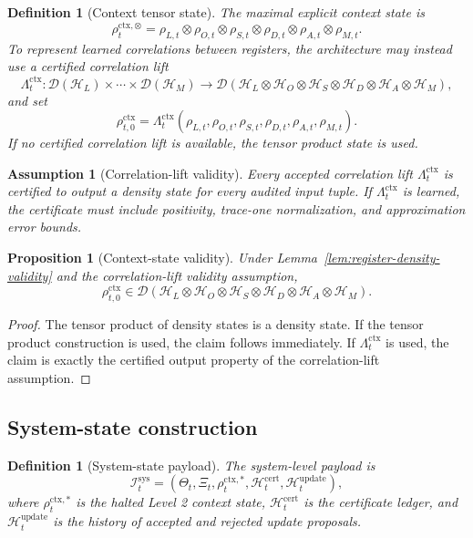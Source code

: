 \documentclass[11pt,a4paper]{article}
\newtheorem{proposition}[theorem]{Proposition}
\newtheorem{definition}[theorem]{Definition}
\newtheorem{assumption}[theorem]{Assumption}
\newcommand{\D}{\mathcal D}
\newcommand{\Hcal}{\mathcal H}
\newcommand{\sys}{\mathrm{sys}}
\newcommand{\ctx}{\mathrm{ctx}}
\newcommand{\cert}{\mathrm{cert}}
\newcommand{\update}{\mathrm{update}}
\begin{document}
\begin{definition}[Context tensor state]
The maximal explicit context state is
\[
\rho_t^{\ctx,\otimes}=\rho_{L,t}\otimes\rho_{O,t}\otimes\rho_{S,t}\otimes\rho_{D,t}\otimes\rho_{A,t}\otimes\rho_{M,t}.
\]
To represent learned correlations between registers, the architecture may instead use a certified correlation lift
\[
\Lambda_t^{\ctx}:\D(\Hcal_L)\times\cdots\times\D(\Hcal_M)\to
\D(\Hcal_L\otimes\Hcal_O\otimes\Hcal_S\otimes\Hcal_D\otimes\Hcal_A\otimes\Hcal_M),
\]
and set
\[
\rho_{t,0}^{\ctx}=\Lambda_t^{\ctx}(\rho_{L,t},\rho_{O,t},\rho_{S,t},\rho_{D,t},\rho_{A,t},\rho_{M,t}).
\]
If no certified correlation lift is available, the tensor product state is used.
\end{definition}

\begin{assumption}[Correlation-lift validity]
Every accepted correlation lift \(\Lambda_t^{\ctx}\) is certified to output a density state for every audited input tuple.  If \(\Lambda_t^{\ctx}\) is learned, the certificate must include positivity, trace-one normalization, and approximation error bounds.
\end{assumption}

\begin{proposition}[Context-state validity]
\label{prop:context-state-validity}
Under Lemma~\ref{lem:register-density-validity} and the correlation-lift validity assumption,
\[
\rho_{t,0}^{\ctx}\in\D(\Hcal_L\otimes\Hcal_O\otimes\Hcal_S\otimes\Hcal_D\otimes\Hcal_A\otimes\Hcal_M).
\]
\end{proposition}

\begin{proof}
The tensor product of density states is a density state.  If the tensor product construction is used, the claim follows immediately.  If \(\Lambda_t^{\ctx}\) is used, the claim is exactly the certified output property of the correlation-lift assumption.
\end{proof}

\subsection{System-state construction}

\begin{definition}[System-state payload]
The system-level payload is
\[
\mathcal I_t^{\sys}=(\Theta_t,\Xi_t,\rho_t^{\ctx,*},\mathcal H_t^{\cert},\mathcal H_t^{\update}),
\]
where \(\rho_t^{\ctx,*}\) is the halted Level 2 context state, \(\mathcal H_t^{\cert}\) is the certificate ledger, and \(\mathcal H_t^{\update}\) is the history of accepted and rejected update proposals.
\end{definition}
\end{document}

